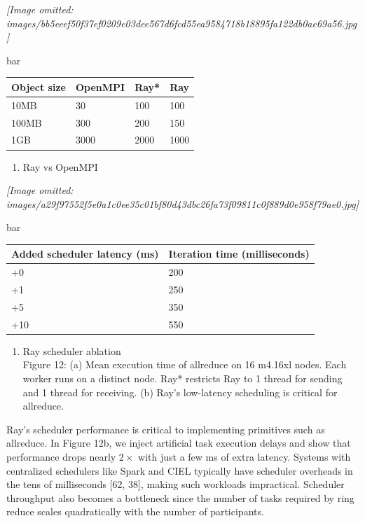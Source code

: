 \documentclass[
]{article}
\newcounter{none} %
\providecommand{\tightlist}{%
  \setlength{\itemsep}{0pt}\setlength{\parskip}{0pt}}
\begin{document}
\textit{[Image omitted: images/bb5eeef50f37ef0209e03dee567d6fcd55ea9584718b18895fa122db0ae69a56.jpg]}

bar

{\def\LTcaptype{none} %
\begin{longtable}[]{@{}llll@{}}
\toprule\noalign{}
Object size & OpenMPI & Ray* & Ray \\
\midrule\noalign{}
\endhead
\bottomrule\noalign{}
\endlastfoot
10MB & 30 & 100 & 100 \\
100MB & 300 & 200 & 150 \\
1GB & 3000 & 2000 & 1000 \\
\end{longtable}
}

\begin{enumerate}
\def\labelenumi{(\alph{enumi})}
\tightlist
\item
  Ray vs OpenMPI
\end{enumerate}

\textit{[Image omitted: images/a29f97552f5e0a1c0ee35c01bf80d43dbc26fa73f09811c0f889d0e958f79ae0.jpg]}

bar

{\def\LTcaptype{none} %
\begin{longtable}[]{@{}ll@{}}
\toprule\noalign{}
Added scheduler latency (ms) & Iteration time (milliseconds) \\
\midrule\noalign{}
\endhead
\bottomrule\noalign{}
\endlastfoot
+0 & 200 \\
+1 & 250 \\
+5 & 350 \\
+10 & 550 \\
\end{longtable}
}

\begin{enumerate}
\def\labelenumi{(\alph{enumi})}
\setcounter{enumi}{1}
\tightlist
\item
  Ray scheduler ablation\\
  Figure 12: (a) Mean execution time of allreduce on 16 m4.16xl nodes.
  Each worker runs on a distinct node. Ray* restricts Ray to 1 thread
  for sending and 1 thread for receiving. (b) Ray's low-latency
  scheduling is critical for allreduce.
\end{enumerate}

Ray's scheduler performance is critical to implementing primitives such
as allreduce. In Figure 12b, we inject artificial task execution delays
and show that performance drops nearly \(2 \times\) with just a few ms
of extra latency. Systems with centralized schedulers like Spark and
CIEL typically have scheduler overheads in the tens of milliseconds
{[}62, 38{]}, making such workloads impractical. Scheduler throughput
also becomes a bottleneck since the number of tasks required by ring
reduce scales quadratically with the number of participants.
\end{document}

